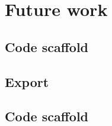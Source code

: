 \section{Future work}
\label{sec:future_work}

\subsection{Code scaffold}

\subsection{Export}

\subsection{Code scaffold}



